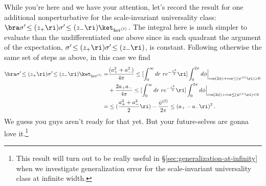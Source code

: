 While you're here and we have your attention, let's record the result for one additional nonperturbative  for the scale-invariant universality class:  $\bra\sigma'\!\le(z_{+}\ri)\sigma'\!\le(z_{-}\ri)\ket_{\ker^{(\ell)}}$. The integral here is much simpler to evaluate than the undifferentiated one above since in each quadrant the argument of the expectation, $\sigma'\!\le(z_{+}\ri)\sigma'\!\le(z_{-}\ri)$, is constant. Following otherwise the same set of steps as above, in this case we find
\begin{align}
\bra\sigma'\!\le(z_{+}\ri)\sigma'\!\le(z_{-}\ri)\ket_{\ker^{(\ell)}}=&\frac{(a_{+}^2+a_{-}^2)}{4\pi}\le[\int_{0}^{\infty}dr\ r e^{-\frac{r^2}{2}}\ri]\int_{0}^{2\pi} d\phi \Big\vert_{\cos(2\phi)+\cos\le(\psi^{(\ell)}\ri)>0} \, \label{eq:johnny-b-goode}\\
&+\frac{2a_{+}a_{-}}{4\pi}\le[\int_{0}^{\infty}dr\ r e^{-\frac{r^2}{2}}\ri]\int_{0}^{2\pi} d\phi \Big\vert_{\cos(2\phi)+\cos\le(\psi^{(\ell)}\ri)<0}\, \notag\\
=&\le(\frac{a_{+}^2+a_{-}^2}{2}\ri)-\frac{\psi^{(\ell)}}{2\pi}\le(a_{+}-a_{-}\ri)^2\, .\notag
\end{align}
We guess you guys aren't ready for that yet. But your future-selves are gonna love it.\footnote{This result will turn out to be really useful in \S\ref{sec:generalization-at-infinity} when we investigate
generalization error for the scale-invariant universality class at infinite width.
}




